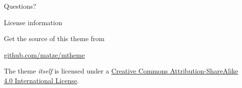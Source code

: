 \documentclass[10pt]{beamer}
\begin{document}
{
\begin{frame}[standout]
  Questions?
\end{frame}
}

\begin{frame}{License information}

  Get the source of this theme from

  \begin{center}\url{github.com/matze/mtheme}\end{center}

  The theme \emph{itself} is licensed under a
  \href{http://creativecommons.org/licenses/by-sa/4.0/}{Creative Commons
  Attribution-ShareAlike 4.0 International License}.

  \begin{center}\ccbysa\end{center}

\end{frame}
\end{document}
